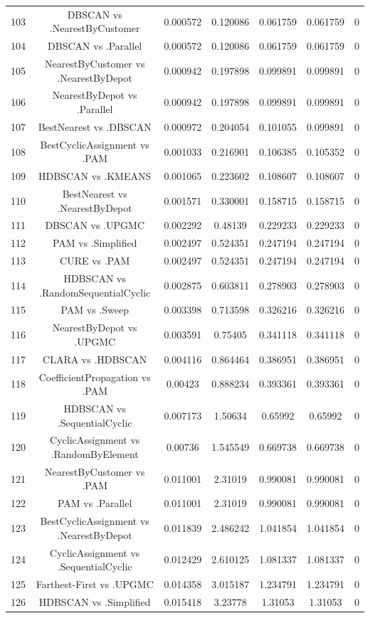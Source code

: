 \documentclass[a4paper,10pt]{article}
\begin{document}
\begin{landscape}
\begin{table}[!htp]
\begin{tabular}{ccccccc}
103&DBSCAN vs .NearestByCustomer&0.000572&0.120086&0.061759&0.061759&0\\
104&DBSCAN vs .Parallel&0.000572&0.120086&0.061759&0.061759&0\\
105&NearestByCustomer vs .NearestByDepot&0.000942&0.197898&0.099891&0.099891&0\\
106&NearestByDepot vs .Parallel&0.000942&0.197898&0.099891&0.099891&0\\
107&BestNearest vs .DBSCAN&0.000972&0.204054&0.101055&0.099891&0\\
108&BestCyclicAssignment vs .PAM&0.001033&0.216901&0.106385&0.105352&0\\
109&HDBSCAN vs .KMEANS&0.001065&0.223602&0.108607&0.108607&0\\
110&BestNearest vs .NearestByDepot&0.001571&0.330001&0.158715&0.158715&0\\
111&DBSCAN vs .UPGMC&0.002292&0.48139&0.229233&0.229233&0\\
112&PAM vs .Simplified&0.002497&0.524351&0.247194&0.247194&0\\
113&CURE vs .PAM&0.002497&0.524351&0.247194&0.247194&0\\
114&HDBSCAN vs .RandomSequentialCyclic&0.002875&0.603811&0.278903&0.278903&0\\
115&PAM vs .Sweep&0.003398&0.713598&0.326216&0.326216&0\\
116&NearestByDepot vs .UPGMC&0.003591&0.75405&0.341118&0.341118&0\\
117&CLARA vs .HDBSCAN&0.004116&0.864464&0.386951&0.386951&0\\
118&CoefficientPropagation vs .PAM&0.00423&0.888234&0.393361&0.393361&0\\
119&HDBSCAN vs .SequentialCyclic&0.007173&1.50634&0.65992&0.65992&0\\
120&CyclicAssignment vs .RandomByElement&0.00736&1.545549&0.669738&0.669738&0\\
121&NearestByCustomer vs .PAM&0.011001&2.31019&0.990081&0.990081&0\\
122&PAM vs .Parallel&0.011001&2.31019&0.990081&0.990081&0\\
123&BestCyclicAssignment vs .NearestByDepot&0.011839&2.486242&1.041854&1.041854&0\\
124&CyclicAssignment vs .SequentialCyclic&0.012429&2.610125&1.081337&1.081337&0\\
125&Farthest-First vs .UPGMC&0.014358&3.015187&1.234791&1.234791&0\\
126&HDBSCAN vs .Simplified&0.015418&3.23778&1.31053&1.31053&0\\

\end{tabular}
\end{table}
\end{landscape}
\end{document}
